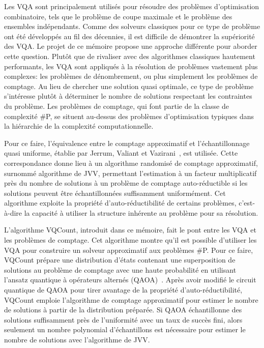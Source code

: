 Les VQA sont principalement utilisés pour résoudre des problèmes d'optimisation combinatoire, tels que le problème de coupe maximale et le problème des ensembles indépendants. Comme des solveurs classiques pour ce type de problème ont été développés au fil des décennies, il est difficile de démontrer la supériorité des VQA. Le projet de ce mémoire propose une approche différente pour aborder cette question. Plutôt que de rivaliser avec des algorithmes classiques hautement performants, les VQA sont appliqués à la résolution de problèmes vastement plus complexes: les problèmes de dénombrement, ou plus simplement les problèmes de comptage. Au lieu de chercher une solution quasi optimale, ce type de problème s'intéresse plutôt à déterminer le nombre de solutions respectant les contraintes du problème. Les problèmes de comptage, qui font partie de la classe de complexité \textsf{\#P}, se situent au-dessus des problèmes d'optimisation typiques dans la hiérarchie de la complexité computationnelle.

Pour ce faire, l'équivalence entre le comptage approximatif et l'échantillonnage quasi uniforme, établie par Jerrum, Valiant et Vazirani~\cite{jerrumRandomGenerationCombinatorial1986}, est utilisée. Cette correspondance donne lieu à un algorithme randomisé de comptage approximatif, surnommé algorithme de JVV, permettant l'estimation à un facteur multiplicatif près du nombre de solutions à un problème de comptage auto-réductible si les solutions peuvent être échantillonnées suffisamment uniformément. Cet algorithme exploite la propriété d'auto-réductibilité de certains problèmes, c'est-à-dire la capacité à utiliser la structure inhérente au problème pour sa résolution.

L'algorithme VQCount, introduit dans ce mémoire, fait le pont entre les VQA et les problèmes de comptage. Cet algorithme montre qu'il est possible d'utiliser les VQA pour construire un solveur approximatif aux problèmes \textsf{\#P}. Pour ce faire, VQCount prépare une distribution d'états contenant une superposition de solutions au problème de comptage avec une haute probabilité en utilisant l'ansatz quantique à opérateurs alternés (QAOA)~\cite{hadfieldQuantumApproximateOptimization2019}. Après avoir modifié le circuit quantique de QAOA pour tirer avantage de la propriété d'auto-réductibilité, VQCount emploie l'algorithme de comptage approximatif pour estimer le nombre de solutions à partir de la distribution préparée. Si QAOA échantillonne des solutions suffisamment près de l'uniformité avec un taux de succès fini, alors seulement un nombre polynomial d'échantillons est nécessaire pour estimer le nombre de solutions avec l'algorithme de JVV. 

